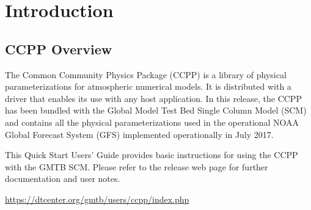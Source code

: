 \chapter{Introduction}
\setlength{\parskip}{12pt}
\section{CCPP Overview}

The Common Community Physics Package (CCPP) is a library of physical parameterizations for atmospheric numerical models. It is distributed with a driver that enables its use with any host application. In this release, the CCPP has been bundled with the Global Model Test Bed Single Column Model (SCM) and contains all the physical parameterizations used in the operational NOAA Global Forecast System (GFS) implemented operationally in July 2017.

This Quick Start Users' Guide provides basic instructions for using the CCPP with the GMTB SCM.  Please refer to the release web page for further documentation and user notes.

\url{https://dtcenter.org/gmtb/users/ccpp/index.php}